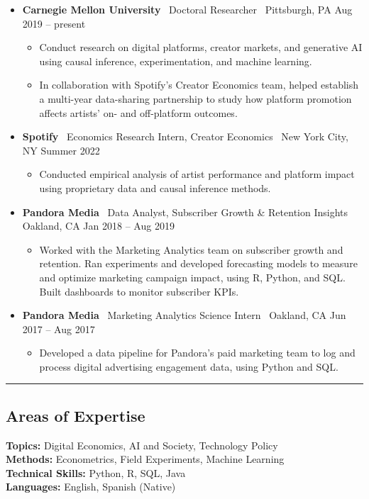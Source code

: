 \documentclass[10pt,letterpaper]{article}
\newcommand{\sep}{{\color{gray}\,\textbullet\,\,}}
\newcommand{\hsep}{\noindent\textcolor{gray}{\rule{\textwidth}{0.5pt}}}
\newcommand{\block}[1]{\begin{samepage}\hsep\subsection*{#1}\end{samepage}}
\begin{document}
\begin{itemize}
\item \textbf{Carnegie Mellon University} \sep Doctoral Researcher \sep Pittsburgh, PA \hfill Aug 2019 -- present
  \begin{itemize}[label={}]
  \item Conduct research on digital platforms, creator markets, and generative AI using causal inference, experimentation, and machine learning.
  \item In collaboration with Spotify's Creator Economics team, helped establish a multi-year data-sharing partnership to study how platform promotion affects artists' on- and off-platform outcomes.
  \end{itemize}
\item \textbf{Spotify} \sep Economics Research Intern, Creator Economics \sep New York City, NY \hfill Summer 2022
  \begin{itemize}[label={}]
  \item Conducted empirical analysis of artist performance and platform impact using proprietary data and causal inference methods.
  \end{itemize}
\item \textbf{Pandora Media} \sep Data Analyst, Subscriber Growth \& Retention Insights \sep Oakland, CA \hfill Jan 2018 -- Aug 2019
  \begin{itemize}[label={}]
  \item Worked with the Marketing Analytics team on subscriber growth and retention. Ran experiments and developed forecasting models to measure and optimize marketing campaign impact, using R, Python, and SQL. Built dashboards to monitor subscriber KPIs.
  \end{itemize}
\item \textbf{Pandora Media} \sep Marketing Analytics Science Intern \sep Oakland, CA \hfill Jun 2017 -- Aug 2017
  \begin{itemize}[label={}]
  \item Developed a data pipeline for Pandora's paid marketing team to log and process digital advertising engagement data, using Python and SQL.
  \end{itemize}
\end{itemize}

\block{Areas of Expertise}

\noindent\textbf{Topics:} Digital Economics, AI and Society, Technology Policy \\
\textbf{Methods:} Econometrics, Field Experiments, Machine Learning \\
\textbf{Technical Skills:} Python, R, SQL, Java \\
\textbf{Languages:} English, Spanish (Native)
\end{document}
